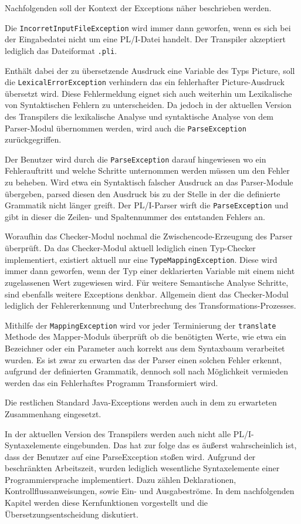 Nachfolgenden soll der Kontext der Exceptions näher beschrieben werden.

Die \verb+IncorretInputFileException+ wird immer dann geworfen, wenn
es sich bei der Eingabedatei nicht um eine PL/I-Datei handelt.
Der Transpiler akzeptiert lediglich das Dateiformat \verb+.pli+.

Enthält dabei der zu übersetzende Ausdruck eine Variable des Typs Picture,
soll die \verb+LexicalErrorException+ verhindern das ein fehlerhafter Picture-Ausdruck übersetzt wird.
Diese Fehlermeldung eignet sich auch weiterhin um Lexikalische von Syntaktischen Fehlern zu unterscheiden. Da jedoch in der aktuellen Version des Transpilers die lexikalische Analyse und syntaktische Analyse von dem Parser-Modul übernommen werden, wird auch die \verb+ParseException+ zurückgegriffen.

Der Benutzer wird durch die \verb+ParseException+ darauf hingewiesen wo ein Fehlerauftritt und welche Schritte unternommen werden müssen um den Fehler zu beheben.
Wird etwa ein Syntaktisch falscher Ausdruck an das Parser-Module übergeben, parsed diesen den Ausdruck
bis zu der Stelle in der die definierte Grammatik nicht länger greift.
Der PL/I-Parser wirft die \verb+ParseException+ und gibt in dieser die Zeilen- und Spaltennummer des
entstanden Fehlers an.

Woraufhin das Checker-Modul nochmal die Zwischencode-Erzeugung des Parser überprüft.
Da das Checker-Modul aktuell lediglich einen Typ-Checker implementiert, existiert aktuell nur eine \verb+TypeMappingException+.
Diese wird immer dann geworfen, wenn der Typ einer deklarierten Variable mit einem nicht zugelassenen Wert zugewiesen wird.
Für weitere Semantische Analyse Schritte, sind ebenfalls weitere Exceptions denkbar. Allgemein dient das Checker-Modul lediglich der Fehlererkennung und Unterbrechung des Transformations-Prozesses.

Mithilfe der \verb+MappingException+ wird vor jeder Terminierung der \verb+translate+ Methode des Mapper-Moduls überprüft ob 
die benötigten Werte, wie etwa ein Bezeichner oder ein Parameter auch korrekt aus dem Syntaxbaum verarbeitet wurden.
Es ist zwar zu erwarten das der Parser einen solchen Fehler erkennt, aufgrund der definierten Grammatik, 
dennoch soll nach Möglichkeit vermieden werden das ein Fehlerhaftes Programm Transformiert wird.

Die restlichen Standard Java-Exceptions werden auch in dem zu erwarteten Zusammenhang eingesetzt.

In der aktuellen Version des Transpilers werden auch nicht alle PL/I-Syntaxelemente eingebunden.
Das hat zur folge das es äußerst wahrscheinlich ist, dass der Benutzer auf eine ParseException stoßen wird.
Aufgrund der beschränkten Arbeitszeit, wurden lediglich wesentliche Syntaxelemente einer Programmiersprache implementiert.
Dazu zählen Deklarationen, Kontrollflussanweisungen, sowie Ein- und Ausgabeströme.
In dem nachfolgenden Kapitel werden diese Kernfunktionen vorgestellt und die Übersetzungsentscheidung
diskutiert. 

